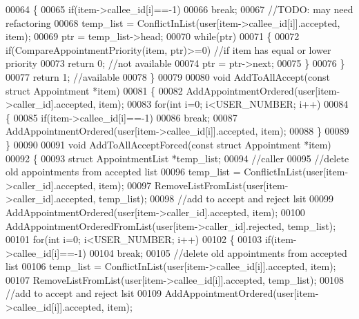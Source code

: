 \begin{DoxyCode}
00064     \{
00065         \textcolor{keywordflow}{if}(item->callee_id[i]==-1)
00066             \textcolor{keywordflow}{break};
00067         \textcolor{comment}{//TODO: may need refactoring}
00068         temp\_list = ConflictInList(user[item->callee_id[i]].accepted, item);
00069         ptr = temp\_list->head;
00070         \textcolor{keywordflow}{while}(ptr)
00071         \{
00072             \textcolor{keywordflow}{if}(CompareAppointmentPriority(item, ptr)>=0)    \textcolor{comment}{//if item has equal or lower priority}
00073                 \textcolor{keywordflow}{return} 0;   \textcolor{comment}{//not available}
00074             ptr = ptr->next;
00075         \}
00076     \}
00077     \textcolor{keywordflow}{return} 1;   \textcolor{comment}{//available}
00078 \}
00079 
00080 \textcolor{keywordtype}{void} AddToAllAccept(\textcolor{keyword}{const} \textcolor{keyword}{struct} Appointment *item)
00081 \{
00082     AddAppointmentOrdered(user[item->caller_id].accepted, item);
00083     \textcolor{keywordflow}{for}(\textcolor{keywordtype}{int} i=0; i<USER_NUMBER; i++)
00084     \{
00085         \textcolor{keywordflow}{if}(item->callee_id[i]==-1)
00086             \textcolor{keywordflow}{break};
00087         AddAppointmentOrdered(user[item->callee_id[i]].accepted, item);
00088     \}
00089 \}
00090 
00091 \textcolor{keywordtype}{void} AddToAllAcceptForced(\textcolor{keyword}{const} \textcolor{keyword}{struct} Appointment *item)
00092 \{
00093     \textcolor{keyword}{struct }AppointmentList *temp\_list;
00094     \textcolor{comment}{//caller}
00095     \textcolor{comment}{//delete old appointments from accepted list}
00096     temp\_list = ConflictInList(user[item->caller_id].accepted, item);
00097     RemoveListFromList(user[item->caller_id].accepted, temp\_list);
00098     \textcolor{comment}{//add to accept and reject lsit}
00099     AddAppointmentOrdered(user[item->caller_id].accepted, item);
00100     AddAppointmentOrderedFromList(user[item->caller_id].rejected, temp\_list);
00101     \textcolor{keywordflow}{for}(\textcolor{keywordtype}{int} i=0; i<USER_NUMBER; i++)
00102     \{
00103         \textcolor{keywordflow}{if}(item->callee_id[i]==-1)
00104             \textcolor{keywordflow}{break};
00105         \textcolor{comment}{//delete old appointments from accepted list}
00106         temp\_list = ConflictInList(user[item->callee_id[i]].accepted, item);
00107         RemoveListFromList(user[item->callee_id[i]].accepted, temp\_list);
00108         \textcolor{comment}{//add to accept and reject lsit}
00109         AddAppointmentOrdered(user[item->callee_id[i]].accepted, item);

\end{DoxyCode}
